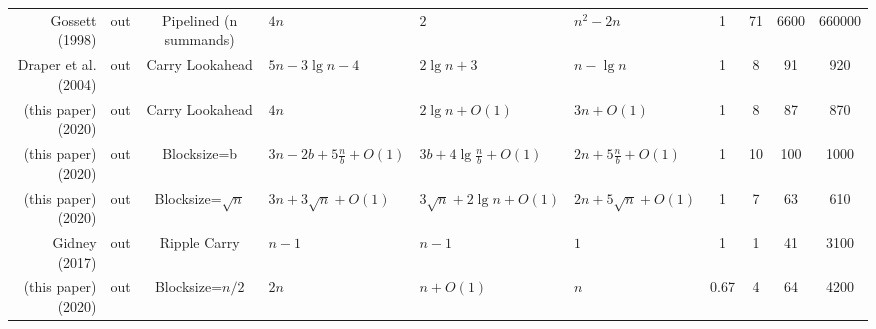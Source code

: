 \begin{tabular}{r|c|c|l|l|l|c|c|c|c}
\hline
Gossett (1998) \cite{gossett1998carrysave}           &out   &Pipelined (n summands) &$4n$                             &$2$                            &$n^2 - 2n$                 &1    &71            &6600            &660000            \\
Draper et al. (2004) \cite{draper2004lookaheadadder} &out   &Carry Lookahead        &$5n - 3\lg n - 4$                &$2\lg n + 3$                   &$n - \lg n$                &1    &8             &91              &920               \\
(this paper) (2020)                                  &out   &Carry Lookahead        &$4n$                             &$2\lg n + O(1)$                &$3n + O(1)$                &1    &8             &87              &870               \\
(this paper) (2020)                                  &out   &Blocksize=b            &$3n - 2b + 5\frac{n}{b} + O(1)$  &$3b + 4\lg \frac{n}{b} + O(1)$ &$2n + 5\frac{n}{b} + O(1)$ &1    &10            &100             &1000              \\
(this paper) (2020)                                  &out   &Blocksize=$\sqrt{n}$   &$3n + 3\sqrt{n} + O(1)$          &$3\sqrt{n} + 2\lg n + O(1)$    &$2n + 5\sqrt{n} + O(1)$    &1    &7             &63              &610               \\
Gidney (2017) \cite{gidney2018halving}               &out   &Ripple Carry           &$n - 1$                          &$n - 1$                        &$1$                        &1    &1             &41              &3100              \\
(this paper) (2020)                                  &out   &Blocksize=$n/2$        &$2n$                             &$n + O(1)$                     &$n$                        &0.67 &4             &64              &4200              \\
\end{tabular}
